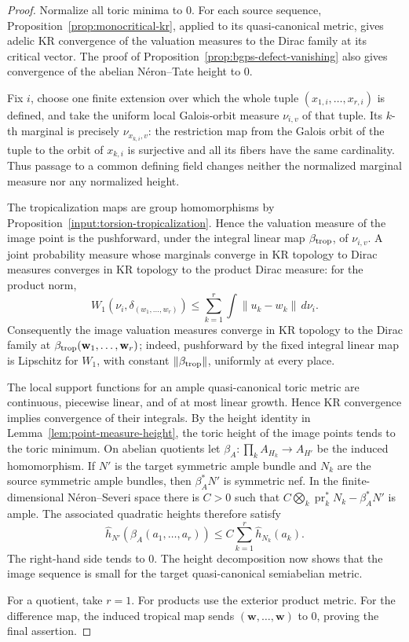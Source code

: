 \documentclass[10pt,a4paper]{amsart}
\theoremstyle{plain}
\theoremstyle{plain}
\numberwithin{equation}{section}
\begin{document}
\begin{proof}
	Normalize all toric minima to \(0\).  For each source sequence,
	Proposition~\ref{prop:monocritical-kr}, applied to its quasi-canonical metric,
	gives adelic KR convergence of the valuation measures to the Dirac family at
	its critical vector.  The proof of
	Proposition~\ref{prop:bgps-defect-vanishing} also gives convergence of the
	abelian N\'eron--Tate height to \(0\).
	
	Fix \(i\), choose one finite extension over which the whole tuple
	\((x_{1,i},\ldots,x_{r,i})\) is defined, and take the uniform local Galois-orbit
	measure \(\nu_{i,v}\) of that tuple.  Its \(k\)-th marginal is precisely
	\(\nu_{x_{k,i},v}\): the restriction map from the Galois orbit of the tuple to
	the orbit of \(x_{k,i}\) is surjective and all its fibers have the same
	cardinality.  Thus passage to a common defining field changes neither the
	normalized marginal measure nor any normalized height.
	
	The tropicalization maps are group homomorphisms by
	Proposition~\ref{input:torsion-tropicalization}.  Hence the valuation measure
	of the image point is the pushforward, under the integral linear map
	\(\beta_{\rm trop}\), of \(\nu_{i,v}\).  A
	joint probability measure whose marginals converge in KR topology to Dirac
	measures converges in KR topology to the product Dirac measure: for the product
	norm,
	\[
	W_1\!\left(\nu_i,\delta_{(w_1,\ldots,w_r)}\right)
	\le
	\sum_{k=1}^r
	\int\!\|u_k-w_k\|\,d\nu_i.
	\]
	Consequently the image valuation measures converge in KR topology to the
	Dirac family at \(\beta_{\rm trop}(\mathbf w_1,\ldots,\mathbf w_r)\); indeed,
	pushforward by the fixed integral linear map is Lipschitz for \(W_1\), with
	constant \(\|\beta_{\rm trop}\|\), uniformly at every place.
	
	The local support functions for an ample quasi-canonical toric metric are
	continuous, piecewise linear, and of at most linear growth.  Hence KR
	convergence implies convergence of their integrals.  By the height
	identity in Lemma~\ref{lem:point-measure-height}, the toric height of the image
	points tends to the toric minimum.  On abelian quotients let
	\(\beta_A:\prod_k A_{H_k}\to A_{H'}\) be the induced homomorphism.  If
	\(N'\) is the target symmetric ample bundle and \(N_k\) are the source
	symmetric ample bundles, then \(\beta_A^*N'\) is symmetric nef.  In the
	finite-dimensional N\'eron--Severi space there is \(C>0\) such that
	\(C\bigotimes_k\operatorname{pr}_k^*N_k-\beta_A^*N'\) is ample.  The associated
	quadratic heights therefore satisfy
	\[
	\widehat h_{N'}\!\left(\beta_A(a_1,\ldots,a_r)\right)
	\le C\sum_{k=1}^r\widehat h_{N_k}(a_k).
	\]
	The right-hand side tends to \(0\).  The height decomposition now shows that the
	image sequence is small for the target quasi-canonical semiabelian metric.
	
	For a quotient, take \(r=1\).  For products use the exterior product metric.
	For the difference map, the induced tropical map sends
	\((\mathbf w,\ldots,\mathbf w)\) to \(0\), proving the final assertion.
\end{proof}
\end{document}
